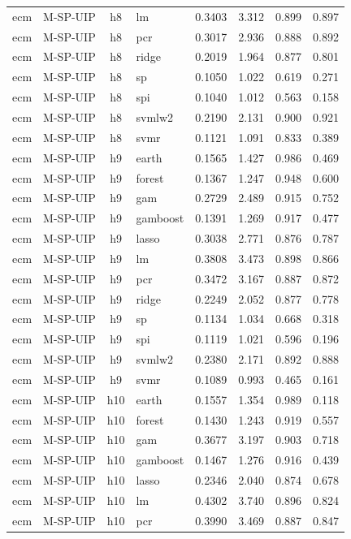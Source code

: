 \begin{ThreePartTable}
\begin{longtable}[t]{llclcccc}
ecm & M-SP-UIP & h8 & lm & 0.3403 & 3.312 & 0.899 & 0.897\\
ecm & M-SP-UIP & h8 & pcr & 0.3017 & 2.936 & 0.888 & 0.892\\
ecm & M-SP-UIP & h8 & ridge & 0.2019 & 1.964 & 0.877 & 0.801\\
ecm & M-SP-UIP & h8 & sp & 0.1050 & 1.022 & 0.619 & 0.271\\
ecm & M-SP-UIP & h8 & spi & 0.1040 & 1.012 & 0.563 & 0.158\\
ecm & M-SP-UIP & h8 & svmlw2 & 0.2190 & 2.131 & 0.900 & 0.921\\
ecm & M-SP-UIP & h8 & svmr & 0.1121 & 1.091 & 0.833 & 0.389\\
\addlinespace
ecm & M-SP-UIP & h9 & earth & 0.1565 & 1.427 & 0.986 & 0.469\\
ecm & M-SP-UIP & h9 & forest & 0.1367 & 1.247 & 0.948 & 0.600\\
ecm & M-SP-UIP & h9 & gam & 0.2729 & 2.489 & 0.915 & 0.752\\
ecm & M-SP-UIP & h9 & gamboost & 0.1391 & 1.269 & 0.917 & 0.477\\
ecm & M-SP-UIP & h9 & lasso & 0.3038 & 2.771 & 0.876 & 0.787\\
ecm & M-SP-UIP & h9 & lm & 0.3808 & 3.473 & 0.898 & 0.866\\
ecm & M-SP-UIP & h9 & pcr & 0.3472 & 3.167 & 0.887 & 0.872\\
ecm & M-SP-UIP & h9 & ridge & 0.2249 & 2.052 & 0.877 & 0.778\\
ecm & M-SP-UIP & h9 & sp & 0.1134 & 1.034 & 0.668 & 0.318\\
ecm & M-SP-UIP & h9 & spi & 0.1119 & 1.021 & 0.596 & 0.196\\
ecm & M-SP-UIP & h9 & svmlw2 & 0.2380 & 2.171 & 0.892 & 0.888\\
ecm & M-SP-UIP & h9 & svmr & 0.1089 & 0.993 & 0.465 & 0.161\\
\addlinespace
ecm & M-SP-UIP & h10 & earth & 0.1557 & 1.354 & 0.989 & 0.118\\
ecm & M-SP-UIP & h10 & forest & 0.1430 & 1.243 & 0.919 & 0.557\\
ecm & M-SP-UIP & h10 & gam & 0.3677 & 3.197 & 0.903 & 0.718\\
ecm & M-SP-UIP & h10 & gamboost & 0.1467 & 1.276 & 0.916 & 0.439\\
ecm & M-SP-UIP & h10 & lasso & 0.2346 & 2.040 & 0.874 & 0.678\\
ecm & M-SP-UIP & h10 & lm & 0.4302 & 3.740 & 0.896 & 0.824\\
ecm & M-SP-UIP & h10 & pcr & 0.3990 & 3.469 & 0.887 & 0.847\\

\end{longtable}
\end{ThreePartTable}
